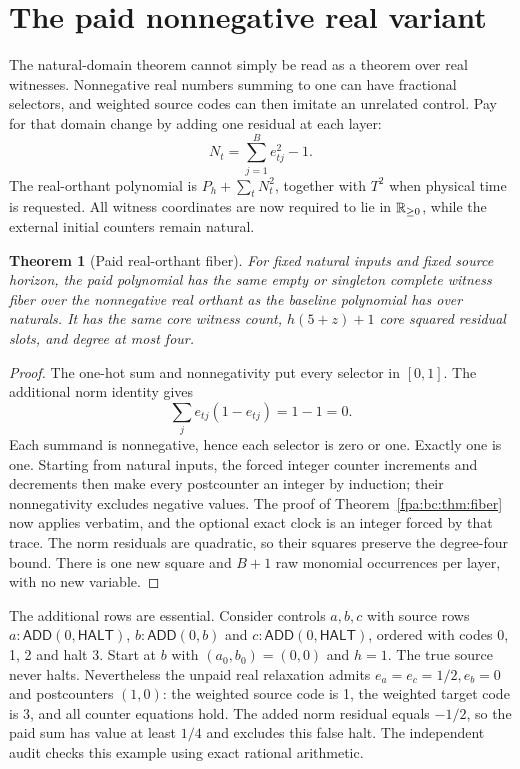 \documentclass[11pt,a4paper]{article}
\numberwithin{equation}{section}
\newtheorem{theorem}{Theorem}[section]
\newcommand{\ADD}{\mathsf{ADD}}\newcommand{\SUB}{\mathsf{SUB}}\newcommand{\NOP}{\mathsf{NOP}}\newcommand{\HALT}{\mathsf{HALT}}
\begin{document}
\section{The paid nonnegative real variant}\label{fpa:bc:sec:real}
The natural-domain theorem cannot simply be read as a theorem over real
witnesses. Nonnegative real numbers summing to one can have fractional
selectors, and weighted source codes can then imitate an unrelated control.
Pay for that domain change by adding one residual at each layer:
\begin{equation}
 N_t=\sum_{j=1}^{B}e_{tj}^2-1.\label{fpa:bc:eq:norm}
\end{equation}
The real-orthant polynomial is $P_h+\sum_tN_t^2$, together with $T^2$ when
physical time is requested. All witness coordinates are now required to lie
in $\mathbb R_{\ge0}$, while the external initial counters remain natural.

\begin{theorem}[Paid real-orthant fiber]\label{fpa:bc:thm:real}
For fixed natural inputs and fixed source horizon, the paid polynomial has
the same empty or singleton complete witness fiber over the nonnegative real
orthant as the baseline polynomial has over naturals. It has the same core
witness count, $h(5+z)+1$ core squared residual slots, and degree at most four.
\end{theorem}
\begin{proof}
The one-hot sum and nonnegativity put every selector in $[0,1]$. The additional
norm identity gives
\[
 \sum_j e_{tj}(1-e_{tj})=1-1=0.
\]
Each summand is nonnegative, hence each selector is zero or one. Exactly one
is one. Starting from natural inputs, the forced integer counter increments
and decrements then make every postcounter an integer by induction; their
nonnegativity excludes negative values. The proof of Theorem~\ref{fpa:bc:thm:fiber}
now applies verbatim, and the optional exact clock is an integer forced by
that trace. The norm residuals are quadratic, so their squares preserve the
degree-four bound. There is one new square and $B+1$ raw monomial occurrences
per layer, with no new variable.
\end{proof}

The additional rows are essential. Consider controls $a,b,c$ with source rows
$a:\ADD(0,\HALT)$, $b:\ADD(0,b)$ and $c:\ADD(0,\HALT)$, ordered with codes
0, 1, 2 and halt 3. Start at $b$ with $(a_0,b_0)=(0,0)$ and $h=1$.
The true source never halts. Nevertheless the unpaid real relaxation admits
$e_a=e_c=1/2,e_b=0$ and postcounters $(1,0)$: the weighted source code is 1,
the weighted target code is 3, and all counter equations hold. The added norm
residual equals $-1/2$, so the paid sum has value at least $1/4$ and excludes
this false halt. The independent audit checks this example using exact
rational arithmetic.
\end{document}
